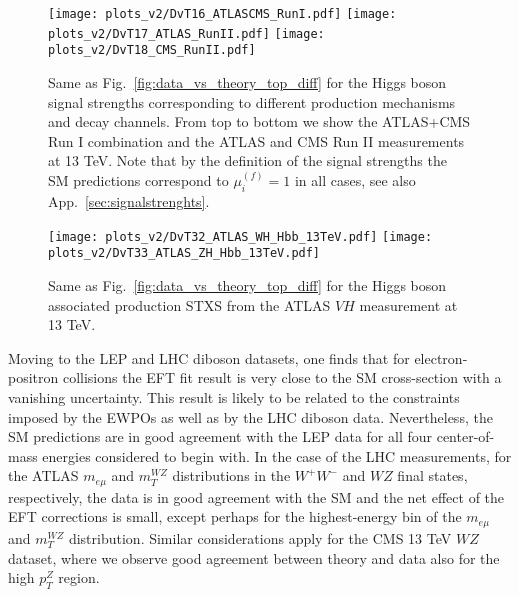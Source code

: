 \begin{figure}[htbp]
  \begin{center}
  \texttt{[image: plots\_v2/DvT16\_ATLASCMS\_RunI.pdf]}
  \texttt{[image: plots\_v2/DvT17\_ATLAS\_RunII.pdf]}
  \texttt{[image: plots\_v2/DvT18\_CMS\_RunII.pdf]}
  \caption{\small Same as Fig.~\ref{fig:data_vs_theory_top_diff} for the Higgs boson
    signal strengths corresponding to different production mechanisms and decay channels.
    From top to bottom we show the ATLAS+CMS Run I combination and the ATLAS and CMS Run II measurements
    at 13 TeV.
    Note that by the definition of the signal strengths the SM predictions correspond to $\mu_i^{(f)}=1$
    in all cases, see also App.~\ref{sec:signalstrenghts}.
 \label{fig:data_vs_theory_v3} }
 \end{center}
\end{figure}

\begin{figure}[htbp]
  \begin{center}
  \texttt{[image: plots\_v2/DvT32\_ATLAS\_WH\_Hbb\_13TeV.pdf]}
  \texttt{[image: plots\_v2/DvT33\_ATLAS\_ZH\_Hbb\_13TeV.pdf]}
  \caption{\small Same as Fig.~\ref{fig:data_vs_theory_top_diff} for the Higgs boson
    associated production STXS from the ATLAS $VH$ measurement at 13 TeV.
 \label{fig:data_vs_theory_v5} }
 \end{center}
\end{figure}

Moving to the LEP and LHC diboson datasets, one finds that for electron-positron collisions
the EFT fit result is very close to the SM cross-section with a vanishing uncertainty.
%
This result is likely to be related to the constraints imposed by the EWPOs as well as by the
LHC diboson data.
%
Nevertheless, the SM predictions are in good agreement with the LEP data for all
four center-of-mass energies considered to begin with.
%
In the case of the LHC measurements, for the ATLAS $m_{e\mu}$ and $m_T^{WZ}$
distributions in the $W^+W^-$ and $WZ$ final states, respectively, the data is in good
agreement with the SM and the net effect of the EFT corrections is small, except
perhaps for the highest-energy bin of the $m_{e\mu}$ and $m_T^{WZ}$ distribution.
%
Similar considerations apply for the CMS 13 TeV $WZ$ dataset, where we observe good
agreement between theory and data also for the high $p_{T}^Z$ region.

